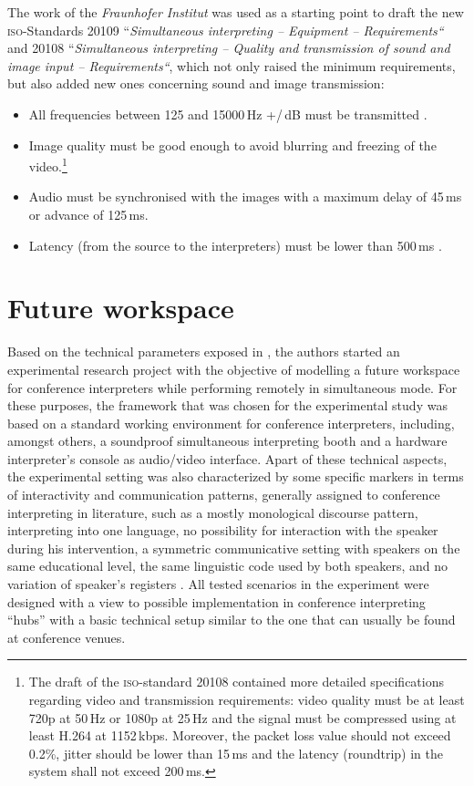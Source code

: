 \documentclass[output=paper]{langsci/langscibook}
\begin{document}
The work of the \textit{Fraunhofer Institut} was used as a starting point to draft the new \textsc{iso}-Standards 20109 “\textit{Simultaneous interpreting -- Equipment -- Requirements“} and 20108 “\textit{Simultaneous interpreting -- Quality and transmission of sound and image input -- Requirements“}, which not only raised the minimum requirements, but also added new ones concerning sound and image transmission:

\begin{itemize}
\item All frequencies between 125 and 15000\,Hz +/\,dB must be transmitted \citep[3]{ISO20109}.
\item Image quality must be good enough to avoid blurring and freezing of the video.\footnote{The draft of the \textsc{iso}-standard 20108 contained more detailed specifications regarding video and transmission requirements: video quality must be at least 720p at 50\,Hz or 1080p at 25\,Hz and the signal must be compressed using at least H.264 at 1152\,kbps. Moreover, the packet loss value should not exceed 0.2\%, jitter should be lower than 15\,ms and the latency (roundtrip) in the system shall not exceed 200\,ms.}
\item Audio must be synchronised with the images with a maximum delay of 45\,ms or advance of 125\,ms.
\item Latency (from the source to the interpreters) must be lower than 500\,ms \citep[7--8]{ISO20108}.
\end{itemize}

\section{Future workspace}
\label{sec:ziegler:06}
Based on the technical parameters exposed in , the authors started an experimental research project with the objective of modelling a future workspace for conference interpreters while performing remotely in simultaneous mode. For these purposes, the framework that was chosen for the experimental study was based on a standard working environment for conference interpreters, including, amongst others, a soundproof simultaneous interpreting booth and a hardware interpreter’s console as audio/video interface. Apart of these technical aspects, the experimental setting was also characterized by some specific markers in terms of interactivity and communication patterns, generally assigned to conference interpreting in literature, such as a mostly monological discourse pattern, interpreting into one language, no possibility for interaction with the speaker during his intervention, a symmetric communicative setting with speakers on the same educational level, the same linguistic code used by both speakers, and no variation of speaker’s registers \citep[582--583]{Angelelli2000}. All tested scenarios in the experiment were designed with a view to possible implementation in conference interpreting “hubs” with a basic technical setup similar to the one that can usually be found at conference venues.
\end{document}
